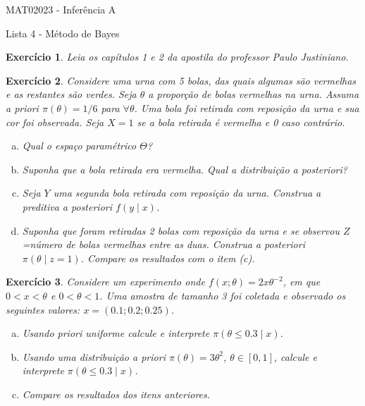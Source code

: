 \documentclass[letter,11pt]{article}
\newtheorem{exer}{Exercício}
\begin{document}
\begin{center}{ \Large MAT02023 - Inferência A }\end{center}

\begin{center}
{\large  \sc Lista 4 - Método de Bayes}
\end{center}
\vspace{15mm}

\begin{exer} \rm
Leia os capítulos 1 e 2 da apostila do professor Paulo Justiniano.
\end{exer}


\bigskip
\begin{exer} \rm
Considere uma urna com 5 bolas, das quais algumas são vermelhas e as restantes são verdes. Seja $\theta$ a proporção de bolas vermelhas na urna. Assuma a \textit{priori} $\pi(\theta)=1/6$ para $\forall \theta$. Uma bola foi retirada com reposição da urna e sua cor foi observada. Seja $X=1$ se a bola retirada é vermelha e 0 caso contrário.

\begin{enumerate}[a)]
	\item Qual o espaço paramétrico $\Theta$?
	\item Suponha que a bola retirada era vermelha. Qual a distribuição a \textit{posteriori}?
	\item Seja $Y$ uma segunda bola retirada com reposição da urna. Construa a preditiva a \textit{posteriori} $f(y \mid x)$.
	\item Suponha que foram retiradas 2 bolas com reposição da urna e se observou $Z$=número de bolas vermelhas entre as duas. Construa a \textit{posteriori} $\pi(\theta \mid z=1)$. Compare os resultados com o item (c).
\end{enumerate}
\end{exer}


\bigskip
\begin{exer} \rm
Considere um experimento onde $f(x; \theta)=2x\theta^{-2}$, em que $0< x < \theta$ e $0<\theta <1$. Uma amostra de tamanho 3 foi coletada e observado os seguintes valores: $x = (0.1; 0.2; 0.25)$.
\begin{enumerate}[a)]
	\item Usando \textit{priori} uniforme calcule e interprete $\pi(\theta \leq 0.3 \mid x)$.
	\item Usando uma distribuição a \textit{priori} $\pi(\theta)=3\theta^2$, $\theta \in [0,1]$, calcule e interprete $\pi(\theta \leq 0.3 \mid x)$.
	\item Compare os resultados dos itens anteriores.
\end{enumerate}
\end{exer}
\end{document}
